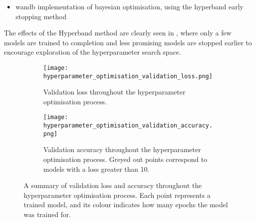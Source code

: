 {\color{red}
  \begin{itemize}
    \item wandb \cite{wandb} implementation of bayesian optimisation, using the hyperband early stopping method
  \end{itemize}
}

The effects of the Hyperband method are clearly seen in \figureautorefname{ \ref{fig:hyperparameter_optimisation_validation_loss_and_accuracy}}, where only a few models are trained to completion and less promising models are stopped earlier to encourage exploration of the hyperparameter search space.

\begin{figure}
    \centering
    \begin{subfigure}[t]{\textwidth}
        \texttt{[image: hyperparameter\_optimisation\_validation\_loss.png]}
        \label{fig:hyperparameter_optimisation_validation_loss}
        \caption{Validation loss throughout the hyperparameter optimisation process.}
    \end{subfigure}
    \par\bigskip %
    \par\bigskip
    \begin{subfigure}[b]{\textwidth}
        \texttt{[image: hyperparameter\_optimisation\_validation\_accuracy.png]}
        \label{fig:hyperparameter_optimisation_validation_accuracy}
        \caption{Validation accuracy throughout the hyperparameter optimisation process. Greyed out points correspond to models with a loss greater than 10.}
    \end{subfigure}
    \caption{A summary of validation loss and accuracy throughout the hyperparameter optimisation process. Each point represents a trained model, and its colour indicates how many epochs the model was trained for.}
    \label{fig:hyperparameter_optimisation_validation_loss_and_accuracy}
\end{figure}
 
 
